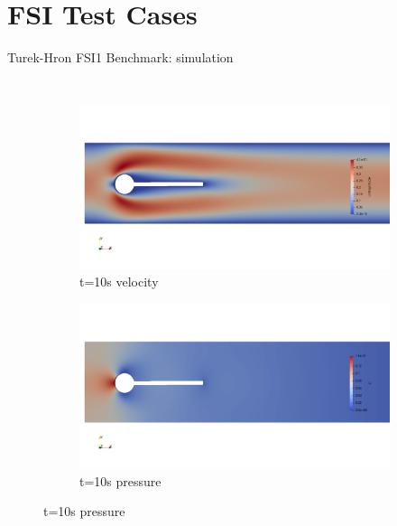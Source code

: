 \documentclass[10pt,t]{beamer}
\begin{document}
\section{FSI Test Cases}

\begin{frame}{Turek-Hron FSI1 Benchmark: simulation}

\begin{columns}


\vspace{0.5cm}

\begin{figure}
    \centering
    \begin{subfigure}{0.95\textwidth}
    
    \includegraphics[width=\linewidth, trim=0 200 0 120, clip]{images/FSI1/FSI1_vel.png}
    \caption{t=10s velocity}
    \end{subfigure}\hfil
    
    \medskip
    
    \begin{subfigure}{0.95\textwidth}
    
    \includegraphics[width=\linewidth, trim=0 200 0 120, clip]{images/FSI1/FSI1_p.png}
    \caption{t=10s pressure}  
    \end{subfigure}\hfil
    

\end{figure}
\end{columns}
\end{frame}
\end{document}
